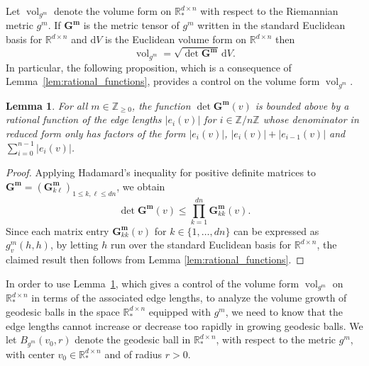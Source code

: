 \documentclass[11pt]{article}
\newtheorem{lemma}[thm]{Lemma}
\newcommand{\R}{\mathbb{R}}
\newcommand{\Z}{\mathbb{Z}}
\newcommand{\vol}{\operatorname{vol}}
\newcommand{\dd}{\,{\mathrm d}}
\newcommand{\db}{{\mathrm d}}
\begin{document}
Let $\vol_{g^m}$ denote the volume form on $\R^{d\times n}_*$ with respect to the Riemannian metric $g^m$. If $\mathbf{G^m}$ is the metric tensor of $g^m$ written in the standard Euclidean basis for $\R^{d\times n}$ and $\db V$ is the Euclidean volume form on $\R^{d\times n}$ then
\begin{displaymath}
    \vol_{g^m}=\sqrt{\det\mathbf{G^m}}\dd V.
\end{displaymath}
In particular, the following proposition, which is a consequence of Lemma~\ref{lem:rational_functions}, provides a control on the volume form $\vol_{g^m}$.

\begin{lemma}\label{lem:volume_control_via_edges}
    For all $m\in\Z_{\geq 0}$, the function $\det\mathbf{G^m}(v)$ is bounded above by a rational function of the edge lengths $|e_i(v)|$ for $i\in \Z/n\Z$ whose denominator in reduced form only has factors of the form $|e_i(v)|$, $|e_i(v)|+|e_{i-1}(v)|$ and $\sum_{i=0}^{n-1}|e_i(v)|$.
\end{lemma}
\begin{proof}
    Applying Hadamard's inequality for positive definite matrices to $\mathbf{G^m}=(\mathbf{G}_{k\ell}^\mathbf{m})_{1\leq k,\ell\leq dn}$, we obtain
    \begin{displaymath}
        \det\mathbf{G^m}(v)\leq \prod_{k=1}^{dn} \mathbf{G}_{kk}^\mathbf{m}(v).
    \end{displaymath}
    Since each matrix entry $\mathbf{G}_{kk}^\mathbf{m}(v)$ for $k\in\{1,\dots,dn\}$ can be expressed as $g^m_v(h,h)$, by letting $h$ run over the standard Euclidean basis for $\R^{d\times n}$, the claimed result then follows from Lemma \ref{lem:rational_functions}.
\end{proof}

In order to use Lemma~\ref{lem:volume_control_via_edges}, which gives a control of the volume form $\vol_{g^m}$ on $\R^{d\times n}_*$ in terms of the associated edge lengths, to analyze the volume growth of geodesic balls in the space $\R^{d\times n}_*$ equipped with $g^m$, we need to know that the edge lengths cannot increase or decrease too rapidly in growing geodesic balls. We let $B_{g^m}(v_0,r)$ denote the geodesic ball in $\R^{d\times n}_*$, with respect to the metric $g^m$, with center $v_0\in \R^{d\times n}_*$ and of radius $r>0$.
\end{document}
